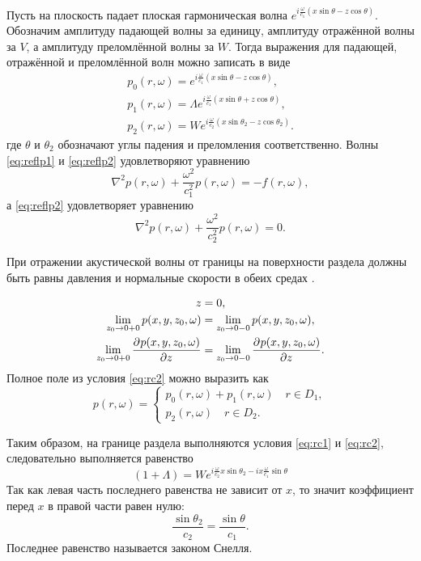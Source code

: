 \documentclass[a4paper, fontsize=14pt]{article}
\begin{document}
	Пусть на плоскость падает плоская гармоническая волна $e^{i\frac{\omega}{c_1}(x\sin \theta - z\cos \theta)}$.
	Обозначим амплитуду падающей волны за единицу, амплитуду отражённой волны за $V$, а амплитуду преломлённой волны за $W$.
	Тогда выражения для падающей, отражённой и преломлённой волн можно записать в виде \cite{brehovskih} 
	\begin{gather}
		p_0(r,\omega) = e^{i\frac{\omega}{c_1}(x\sin \theta - z\cos \theta)},\label{eq:reflp0}\\ 
		p_1(r,\omega) = \Lambda e^{i\frac{\omega}{c_1}(x\sin \theta + z\cos \theta)},\label{eq:reflp1}\\
		p_2(r,\omega) = W e^{i\frac{\omega}{c_2}(x\sin \theta_2 - z\cos \theta_2)}\label{eq:reflp2}.
	\end{gather}
	где $\theta$ и $\theta_2$ обозначают углы падения и преломления соответственно. Волны \eqref{eq:reflp1} и \eqref{eq:reflp2} удовлетворяют уравнению 
	\begin{equation}
		\nabla^2 p(r,\omega) + \frac{\omega^2}{c_1^2}p(r,\omega) = - f(r,\omega),
	\end{equation}
	а  \eqref{eq:reflp2} удовлетворяет уравнению
	\begin{equation}
		\nabla^2 p(r,\omega) + \frac{\omega^2}{c_2^2}p(r,\omega) = 0.
	\end{equation}
	
	При отражении акустической волны от границы на поверхности раздела должны быть равны давления и нормальные скорости в обеих средах \cite{landavshic}.
	
	\begin{gather}
		z=0,\label{eq:rc1}\\
		\lim_{z_0\to 0+0} p(x,y,z_0,\omega) = \lim_{z_0\to 0-0} p(x,y,z_0,\omega), \label{eq:rc2}\\
		\lim_{z_0\to 0+0} \frac{\partial ^ {  } {p(x,y,z_0,\omega)}}{\partial {z} ^ {  } } = \lim_{z_0\to 0-0} \frac{\partial ^ {  } {p(x,y,z_0,\omega)}}{\partial {z} ^ {  } }.\label{eq:rc3}
	\end{gather}
	Полное поле из условия \eqref{eq:rc2} можно выразить как 
	\begin{equation}
		p(r,\omega) = \begin{cases}
			p_0(r,\omega)+p_1(r,\omega) \quad r\in D_1, \\
			p_2(r,\omega) \quad r \in D_2.
		\end{cases}
	\end{equation}
	
	Таким образом, на границе раздела выполняются условия \eqref{eq:rc1} и \eqref{eq:rc2}, следовательно выполняется равенство
	\begin{equation}
		(1+\Lambda)= W e^{i\frac{\omega}{c_2}x\sin \theta_2  - ix\frac{\omega}{c_1}\sin \theta}
	\end{equation}
	Так как левая часть последнего равенства не зависит от $x$, то значит  коэффициент перед  $x$ в правой части равен нулю:
	\begin{equation}
		\frac{\sin \theta_2}{c_2} = \frac{\sin \theta}{c_1}.
	\label{eq:snell}
	\end{equation}
	Последнее равенство называется законом Снелля.
	
\end{document}
